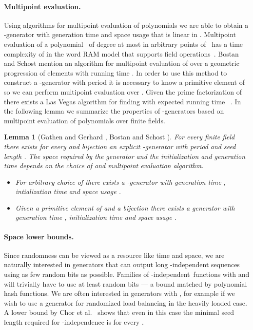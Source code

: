 \documentclass[a4paper,11pt]{article}
\theoremstyle{plain}
\newtheorem{lemma}{Lemma}
\theoremstyle{definition}
\begin{document}
\paragraph{Multipoint evaluation.}
Using algorithms for multipoint evaluation of polynomials we are able to obtain a \mbox{-generator} with  generation time and space usage that is linear in . 
Multipoint evaluation of a polynomial~ of degree at most  in  arbitrary points of~ has a time complexity of  in the word RAM model that supports field operations~\mbox{\cite[Corollary 10.8]{gathen2013}}. 
Bostan and Schost \cite{bostan2005} mention an algorithm for multipoint evaluation of  over a geometric progression of  elements with running time . 
In order to use this method to construct a -generator with period  
it is necessary to know a primitive element  of  so we can perform multipoint evaluation over . 
Given the prime factorization of  there exists a Las Vegas algorithm for finding  with expected running time ~\mbox{\cite[Chapter 11]{shoup2009}}. 
In the following lemma we summarize the properties of -generators based on multipoint evaluation of polynomials over finite fields.         

\begin{lemma}[{Gathen and Gerhard \cite[Corollary 10.8]{gathen2013}, Bostan and Schost \cite{bostan2005}}] \label{lem:multipoint}
For every finite field  there exists for every  and bijection  an explicit -generator with period  and seed length .
The space required by the generator and the initialization and generation time depends on the choice of  and multipoint evaluation algorithm.
\begin{itemize}
\item[--] For arbitrary choice of  there exists a -generator with generation time , intialization time  and space usage . 
\item[--] Given a primitive element  of  and a bijection  there exists a generator with generation time , initialization time  and space usage .
\end{itemize}
\end{lemma}

\paragraph{Space lower bounds.}
Since randomness can be viewed as a resource like time and space, we are naturally interested in generators that can output long -independent sequences using as few random bits as possible. 
Families of \mbox{-independent functions}  with  and  will trivially have to use at least  random bits --- a bound matched by polynomial hash functions. 
We are often interested in generators with , for example if we wish to use a generator for randomized load balancing in the heavily loaded case. 
A lower bound by Chor et al.~\cite{chor1985} shows that even in this case the minimal seed length required for -independence is  for every .
\end{document}
